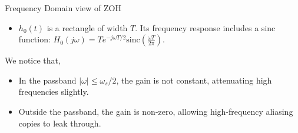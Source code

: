 \begin{frame}{Frequency Domain view of ZOH}
  \vspace{0.4cm}
  \begin{itemize}
    \item $h_0(t)$ is a rectangle of width $T$. Its frequency response includes a sinc function: $H_0(j\omega) = T e^{-j\omega T/2} \text{sinc}\left(\frac{\omega T}{2\pi}\right)$.

  \end{itemize}

  We notice that,
  \begin{itemize}
    \item In the passband $|\omega| \le \omega_s/2$, the gain is not constant, attenuating high frequencies slightly.
    \item Outside the passband, the gain is non-zero, allowing high-frequency aliasing copies to leak through.
  \end{itemize}
\end{frame}

